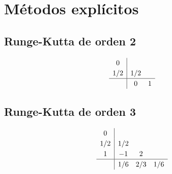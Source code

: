     \vspace{-10pt}

    \section*{Métodos explícitos} 

    \vspace{-20pt}

    \noindent\begin{minipage}[t]{.5\linewidth}
        \subsection{Runge-Kutta de orden 2}
            \begin{equation}\label{eq:rk2}
                \renewcommand\arraystretch{1.2}
                \begin{array}{c|cc}
                0\\
                1/2 & 1/2\\
                \hline
                & 0 & 1
                \end{array}
            \end{equation}
    \end{minipage}%
    \begin{minipage}[t]{.5\linewidth}
        \subsection{Runge-Kutta de orden 3}
            \begin{equation}\label{eq:rk3}
                \renewcommand\arraystretch{1.2}
                \begin{array}{c|ccc}
                0\\
                1/2 & 1/2\\
                1 & -1 & 2\\
                \hline
                & 1/6& 2/3 & 1/6
                \end{array}
            \end{equation}
    \end{minipage}
    
    \vfill
    
